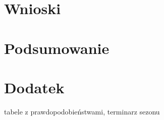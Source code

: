 \documentclass[inzynierska]{pwr_wmat_praca_dyplomowa}
\theoremstyle{plain}
\numberwithin{theorem}{chapter}
\theoremstyle{definition}
\numberwithin{theorem}{chapter}
\begin{document}
\chapter{Wnioski}


{\backmatter \chapter{Podsumowanie}}

{\backmatter \chapter{Dodatek}}
tabele z prawdopodobieństwami, terminarz sezonu

\newpage

\end{document}
